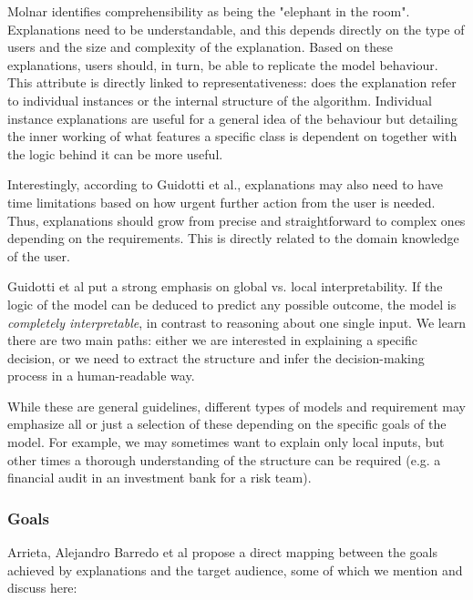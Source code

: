 \documentclass[proposal]{softeng}
\begin{document}
Molnar identifies comprehensibility as being the "elephant in the room". Explanations need to be understandable, and this depends directly on the type of users and the size and complexity of the explanation. Based on these explanations, users should, in turn, be able to replicate the model behaviour. This attribute is directly linked to representativeness: does the explanation refer to individual instances or the internal structure of the algorithm. Individual instance explanations are useful for a general idea of the behaviour but detailing the inner working of what features a specific class is dependent on together with the logic behind it can be more useful.

Interestingly, according to Guidotti et al., explanations may also need to have time limitations based on how urgent further action from the user is needed. Thus, explanations should grow from precise and straightforward to complex ones depending on the requirements. This is directly related to the domain knowledge of the user.

Guidotti et al put a strong emphasis on global vs. local interpretability. If the logic of the model can be deduced to predict any possible outcome, the model is \textit{completely interpretable}, in contrast to reasoning about one single input. We learn there are two main paths: either we are interested in explaining a specific decision, or we need to extract the structure and infer the decision-making process in a human-readable way.

While these are general guidelines, different types of models and requirement may emphasize all or just a selection of these depending on the specific goals of the model. For example, we may sometimes want to explain only local inputs, but other times a thorough understanding of the structure can be required (e.g. a financial audit in an investment bank for a risk team).

\subsubsection{Goals}

Arrieta, Alejandro Barredo et al\cite{BarredoArrietaAlejandro2020EAIX} propose a direct mapping between the goals achieved by explanations and the target audience, some of which we mention and discuss here:
\end{document}
